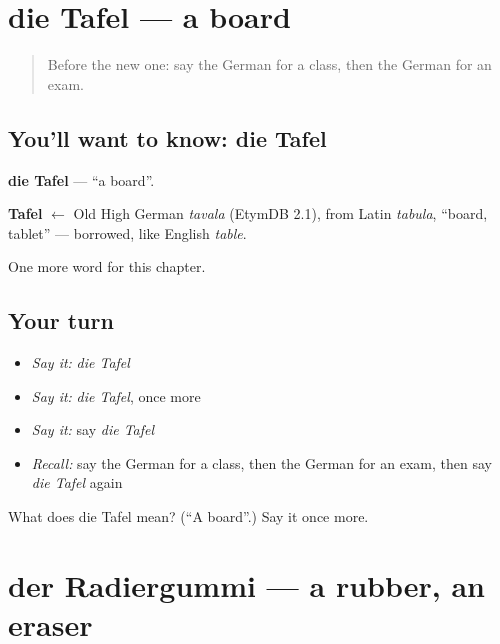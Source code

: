 \section[die Tafel]{die Tafel — a board}

\label{lesson:GE-C127-tafel}



\begin{quote}
Before the new one: say the German for a class, then the German for an exam.
\end{quote}

\subsection*{You'll want to know: die Tafel}
\textbf{die Tafel} — \textquotedblleft{}a board\textquotedblright{}.

\begin{cousinweb}
\textbf{Tafel} $\leftarrow$ Old High German \emph{tavala} (EtymDB 2.1), from Latin \emph{tabula}, \textquotedblleft{}board, tablet\textquotedblright{} — borrowed, like English \emph{table}.
\end{cousinweb}

\begin{grammarlens}[title={What you've built}]
One more word for this chapter.
\end{grammarlens}

\subsection*{Your turn}
\begin{itemize}
\raggedright
  \item \emph{Say it:} \emph{die Tafel}
  \item \emph{Say it:} \emph{die Tafel}, once more
  \item \emph{Say it:} say \emph{die Tafel}
  \item \emph{Recall:} say the German for a class, then the German for an exam, then say \emph{die Tafel} again
\end{itemize}

\begin{tcolorbox}[breakable,colback=teal!4,colframe=teal!35!black,title={Before you move on}]
What does die Tafel mean? (\textquotedblleft{}A board\textquotedblright{}.) Say it once more.
\end{tcolorbox}
\section[der Radiergummi]{der Radiergummi — a rubber, an eraser}


